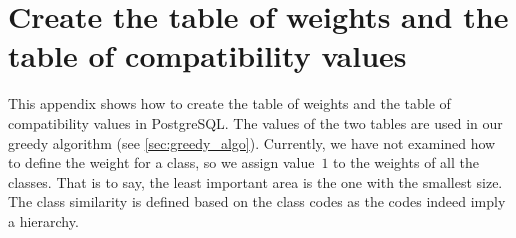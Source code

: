 \documentclass[twocolumn]{svjour3}          %
\begin{document}
\onecolumn
\appendix


\renewcommand{\theequation}{\thesection\arabic{equation}}
\renewcommand{\thetable}{\thesection\arabic{table}}



\section{Create the table of weights and the table of compatibility values}

\label{appx:create_tables}
This appendix shows how to create the table of weights and 
the table of compatibility values in PostgreSQL.
The values of the two tables are used in our greedy algorithm
(see \sect\ref{sec:greedy_algo}).
Currently, we have not examined 
how to define the weight for a class,
so we assign value~$1$ to the weights of all the classes.
That is to say, the least important area is the one with the smallest size.
The class similarity is defined based on the class codes 
as the codes indeed imply a hierarchy.



\bigskip


\end{document}
